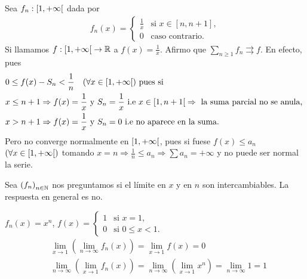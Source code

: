 \begin{eg}
  Sea \(f_n : \interval[open right]{1}{+\infty} \) dada por \begin{align*}
    f_n(x) = \begin{cases}
               \frac{1}{x} & \text{si } x \in [n, n+1], \\
               0           & \text{caso contrario.}
             \end{cases}
  \end{align*}
  Si llamamos \(f: \interval[open right]{1}{+\infty} \to \R \) a \(f(x) = \frac{1}{x} \).
  Afirmo que \(\sum_{n \geq 1} f_n \rightrightarrows f\). En efecto, pues
  \begin{align*}
     & 0 \leq f(x) - S_n < \frac{1}{n} \quad (\forall x \in \interval[open right]{1}{+\infty}) \text{ pues si }                                                                  \\
     & x \leq n+1 \Rightarrow f(x) = \frac{1}{x} \text{ y } S_n = \frac{1}{x} \text{ i.e } x \in \interval[open right]{1}{n+1} \Rightarrow \text{ la suma parcial no se anula, } \\
     & x > n+1 \Rightarrow f(x) = \frac{1}{x} \text{ y } S_n = 0 \text{ i.e no aparece en la suma.}
  \end{align*}
  Pero no converge normalmente en \(\interval[open right]{1}{+\infty}\), pues si fuese \(f(x) \leq a_n\) \((\forall x \in \interval[open right]{1}{+\infty})\) tomando \(x = n \Rightarrow \frac{1}{n} \leq a_n \Rightarrow \sum a_n = + \infty \) y no puede ser normal la serie.
\end{eg}

\begin{note}
  Sea \({(f_n)}_{n \in \mathbb{N}} \) nos preguntamos si el límite en \(x\) y en \(n\) son intercambiables. La respuesta en general es no.
\end{note}

\begin{eg}
  \(f_n(x) = x^n\), \(f(x) = \begin{cases}
      1 & \text{si } x = 1,        \\
      0 & \text{si } 0 \leq x < 1.
    \end{cases} \) \begin{align*}
    & \lim_{x \to 1} \left(\lim_{n \to \infty} f_n(x)\right) = \lim_{x \to 1} f(x) = 0 \\
    & \lim_{n \to \infty} \left(\lim_{x \to 1} f_n(x)\right) = \lim_{n \to \infty} \left(\lim_{x \to 1} x^n\right) = \lim_{n \to \infty} 1 = 1
  \end{align*}
\end{eg}

